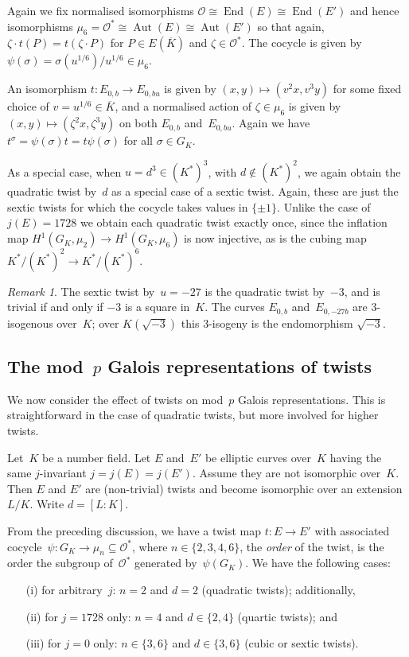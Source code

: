 \documentclass[12pt, reqno]{amsart}
\newcommand{\Kbar}{{\overline{K}}}
\newcommand{\calO}{\mathcal{O}}
\DeclareMathOperator{\Aut}{Aut}
\DeclareMathOperator{\End}{End}
\numberwithin{equation}{section}
\theoremstyle{definition}
\theoremstyle{remark}
\newtheorem{remark}[theorem]{Remark}
\begin{document}
Again we fix normalised isomorphisms $\calO\cong\End(E)\cong\End(E')$
and hence isomorphisms $\mu_6=\calO^*\cong\Aut(E)\cong\Aut(E')$ so
that again, $\zeta\cdot t(P)=t(\zeta\cdot P)$ for $P\in E(\Kbar)$ and
$\zeta\in\calO^*$.  The cocycle is given by $\psi(\sigma) =
\sigma(u^{1/6})/u^{1/6} \in \mu_6$.

An isomorphism $t:E_{0,b}\to E_{0,bu}$ is given by
$(x,y)\mapsto(v^2x,v^3y)$ for some fixed choice of
$v=u^{1/6}\in\Kbar$, and a normalised action of $\zeta\in\mu_6$ is
given by $(x,y)\mapsto(\zeta^2x,\zeta^3y)$ on both $E_{0,b}$
and~$E_{0,bu}$.  Again we have $t^\sigma = \psi(\sigma)t =
t\psi(\sigma)$ for all $\sigma\in G_K$.

As a special case, when $u=d^3\in(K^*)^3$, with $d\notin(K^*)^2$, we
again obtain the quadratic twist by~$d$ as a special case of a sextic
twist.  Again, these are just the sextic twists for which the cocycle
takes values in $\{\pm1\}$.  Unlike the case of $j(E)=1728$ we obtain
each quadratic twist exactly once, since the inflation map
$H^1(G_K,\mu_2)\to H^1(G_K,\mu_6)$ is now injective, as is the cubing
map $K^*/(K^*)^2 \to K^*/(K^*)^6$.

\begin{remark}\label{R:3-isog}
The sextic twist by~$u=-27$ is the quadratic twist by~$-3$, and is
trivial if and only if $-3$ is a square in~$K$.  The curves $E_{0,b}$
and~$E_{0,-27b}$ are $3$-isogenous over~$K$; over $K(\sqrt{-3})$ this
$3$-isogeny is the endomorphism $\sqrt{-3}$.
\end{remark}


\subsection{The mod~$p$ Galois representations of twists}
We now consider the effect of twists on mod~$p$ Galois
representations.  This is straightforward in the case of quadratic
twists, but more involved for higher twists.


Let~$K$ be a number field. Let $E$ and~$E'$ be elliptic curves
over~$K$ having the same $j$-invariant $j = j(E) = j(E')$. Assume they
are not isomorphic over~$K$. Then $E$ and $E'$ are (non-trivial)
twists and become isomorphic over an extension $L/K$. Write $d = [L :
  K]$.

From the preceding discussion, we have a twist map $t : E \to E'$ with
associated cocycle~$\psi : G_K \to \mu_n \subseteq\calO^*$, where
$n\in\{2,3,4,6\}$, the \emph{order} of the twist, is the order the
subgroup of~$\calO^*$ generated by~$\psi(G_K)$.  We have the following
cases:
\begin{itemize}
 \item[(i)] for arbitrary~$j$: $n=2$ and $d = 2$ (quadratic twists);
   additionally,
 \item[(ii)] for $j = 1728$ only: $n=4$ and $d \in \{2,4\}$  (quartic
   twists); and
  \item[(iii)] for $j = 0$ only: $n\in\{3,6\}$ and $d \in \{3,6\}$
    (cubic or sextic twists).
\end{itemize}
\end{document}
